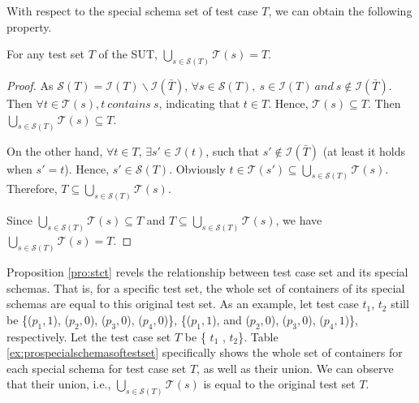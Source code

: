 With respect to the special schema set of test case $T$, we can obtain the following property.

\begin{proposition}\label{pro:stct}
For any test set $T$ of the SUT,  $\bigcup_{s \in \mathcal{S}(T)}\mathcal{T}(s) = T$.
\end{proposition}
\begin{proof}
As $\mathcal{S}(T) =  \mathcal{I}(T) \backslash \mathcal{I}(\bar{T}) $,  $\forall s \in \mathcal{S}(T),\ s \in \mathcal{I}(T)\ and\ s \not\in \mathcal{I}(\bar{T})$. Then $\forall t \in \mathcal{T}(s), t \ contains\ s$, indicating that $t \in T$.  Hence, $\mathcal{T}(s) \subseteq T$.  Then $\bigcup_{s \in \mathcal{S}(T)}\mathcal{T}(s) \subseteq T$.

On the other hand, $\forall t \in T$,  $\exists s' \in \mathcal{I}(t)$, such that $s' \not\in \mathcal{I}(\bar{T})$ (at least it holds when $s' = t$). Hence, $s' \in \mathcal{S}(T)$.  Obviously $t \in \mathcal{T}(s') \subseteq \bigcup_{s \in \mathcal{S}(T)} \mathcal{T}(s)$. Therefore,  $ T \subseteq \bigcup_{s \in \mathcal{S}(T)}\mathcal{T}(s)$.

Since $\bigcup_{s \in \mathcal{S}(T)}\mathcal{T}(s) \subseteq T$ and $T \subseteq \bigcup_{s \in \mathcal{S}(T)}\mathcal{T}(s)$, we have $\bigcup_{s \in \mathcal{S}(T)}\mathcal{T}(s) =  T$.
\end{proof}


Proposition \ref{pro:stct} revels the relationship between test case set and its special schemas. That is, for a specific test set, the whole set of containers of its special schemas are equal to this original test set. As an example,
 let test case $t_{1}$, $t_{2}$  still be \{($p_{1}, 1$), ($p_{2}, 0$), ($p_{3}, 0$), ($p_{4}, 0$)\}, \{($p_{1}, 1$), and ($p_{2}, 0$), ($p_{3}, 0$), ($p_{4}, 1$)\}, respectively. Let the test case set $T$ be \{ $t_{1}$ , $t_{2}$\}.  Table \ref{ex:prospecialschemasoftestset} specifically shows the whole set of containers for each special schema for test case set $T$, as well as their union. We can observe that their union, i.e.,  $\bigcup_{s \in \mathcal{S}(T)}\mathcal{T}(s)$ is equal to the original test set $T$.

